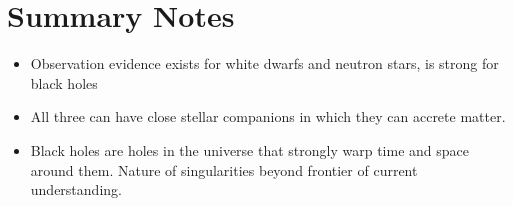 \section{Summary Notes}
\begin{itemize}
\item Observation evidence exists for white dwarfs and neutron stars, is strong for black holes
\item All three can have close stellar companions in which they can accrete matter.
\item Black holes are holes in the universe that strongly warp time and space around them. Nature of singularities beyond frontier of current understanding.
\end{itemize}

